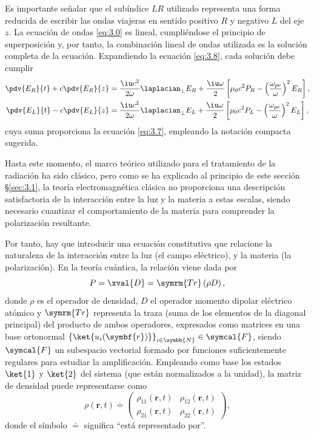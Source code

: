 Es importante señalar que el subíndice $LR$ utilizado representa una forma reducida de escribir las ondas viajeras en sentido positivo $R$ y negativo $L$ del eje $z$. La ecuación de ondas \eqref{eq:3.0} es lineal, cumpliéndose el principio de superposición y, por tanto, la combinación lineal de ondas utilizada es la solución completa de la ecuación. Expandiendo la ecuación \eqref{eq:3.8}, cada solución debe cumplir
\begin{align}
  \pdv{E_{R}}{t} + c \pdv{E_{R}}{z} &= \frac{\iu c^{2}}{2 \omega}\laplacian_{\perp}E_{R} + \frac{\iu \omega}{2} \left[\mu_{0}c^{2}P_{R} - \left(\frac{\omega_{pe}}{\omega}\right)^{2}E_{R}\right], \\
  \pdv{E_{L}}{t} - c \pdv{E_{L}}{z} &= \frac{\iu c^{2}}{2 \omega}\laplacian_{\perp}E_{L} + \frac{\iu \omega}{2} \left[\mu_{0}c^{2}P_{L} - \left(\frac{\omega_{pe}}{\omega}\right)^{2}E_{L}\right],
\end{align}
cuya suma proporciona la ecuación \eqref{eq:3.7}, empleando la notación compacta sugerida.

Hasta este momento, el marco teórico utilizado para el tratamiento de la radiación ha sido clásico, pero como se ha explicado al principio de este sección \S\ref{sec:3.1}, la teoría electromagnética clásica no proporciona una descripción satisfactoria \autocite{Griffiths2017} de la interacción entre la luz y la materia a estas escalas, siendo necesario cuantizar el comportamiento de la materia para comprender la polarización resultante.

Por tanto, hay que introducir una ecuación constitutiva que relacione la naturaleza de la interacción entre la luz (el campo eléctrico), y la materia (la polarización). En la teoría cuántica, la relación \autocite{Cohen-Tannoudji2019} viene dada por
\begin{equation}\label{eq:3.8}
  P = \xval{D} = \symrm{Tr} \left(\rho D \right),
\end{equation}
donde $\rho$ es el operador de densidad, $D$ el operador momento dipolar eléctrico atómico y $\symrm{Tr}$ representa la traza (suma de los elementos de la diagonal principal) del producto de ambos operadores, expresados como matrices en una base ortonormal $\left\{\ket{u_{i}(\symbf{r})}\right\}_{i \in \symbb{N}} \in \symcal{F}$, siendo $\symcal{F}$ un subespacio vectorial \autocite{Cohen-Tannoudji2019} formado por funciones suficientemente regulares para estudiar la amplificación. Empleando como base los estados $\ket{1}$ y $\ket{2}$ del sistema (que están normalizados a la unidad), la matriz de densidad puede representarse como
\begin{equation}\label{eq:3.9}
  \rho(\symbf{r},t) \doteq  
  \begin{pmatrix}
    \rho_{11}(\symbf{r},t) & \rho_{12}(\symbf{r},t) \\
    \rho_{21}(\symbf{r},t) & \rho_{22}(\symbf{r},t)
  \end{pmatrix},
\end{equation}
donde el símbolo $\doteq $ significa \enquote{está representado por}.

